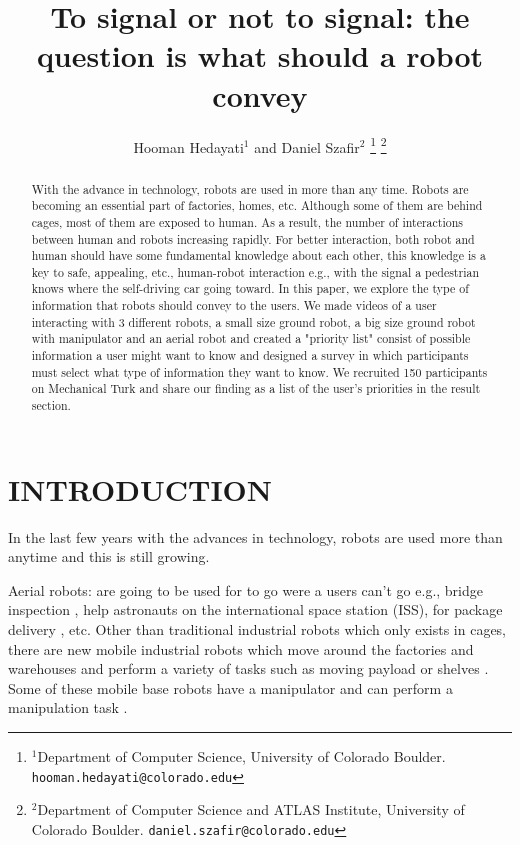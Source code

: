 \documentclass[letterpaper, 10 pt, conference]{ieeeconf}  %
\title{\LARGE \bf
To signal or not to signal: the question is what should a robot convey
}
\author{Hooman Hedayati$^{1}$ and Daniel Szafir$^{2}$%
\thanks{$^{1}$Department of Computer Science, University of Colorado Boulder.
        {\tt\small hooman.hedayati@colorado.edu}}%
	\thanks{$^{2}$Department of Computer Science and ATLAS Institute, University of Colorado Boulder.
		{\tt\small daniel.szafir@colorado.edu}}%
}
\begin{document}
\maketitle

\thispagestyle{empty}
\pagestyle{empty}


\begin{abstract}
With the advance in technology, robots are used in more than any time. Robots are becoming an essential part of factories, homes, etc. Although some of them are behind cages, most of them are exposed to human. As a result, the number of interactions between human and robots increasing rapidly. For better interaction, both robot and human should have some fundamental knowledge about each other, this knowledge is a key to safe, appealing, etc., human-robot interaction e.g., with the signal a pedestrian knows where the self-driving car going toward. In this paper, we explore the type of information that robots should convey to the users.  We made videos of a user interacting with 3 different robots, a small size ground robot, a big size ground robot with manipulator and an aerial robot and created a "priority list" consist of possible information a user might want to know and designed a survey in which participants must select what type of information they want to know. We recruited 150 participants on Mechanical Turk and share our finding as a list of the user's priorities in the result section.

\end{abstract}


\section{INTRODUCTION}
In the last few years with the advances in technology, robots are used more than anytime and this is still growing.

Aerial robots: are going to be used for to go were a users can't go e.g., bridge inspection \cite{chan2015towards}, help astronauts on the international space station (ISS)\cite{bualat2015astrobee}, for package delivery \cite{d2014guest}, etc. 
Other than traditional industrial robots which only exists in cages, there are new mobile industrial robots which move around the factories and warehouses and perform a variety of tasks such as moving payload or shelves \cite{wurman2008coordinating}. Some of these mobile base robots have a manipulator and can perform a manipulation task \cite{datta2008development, hvilshoj2011little}. 
\end{document}
